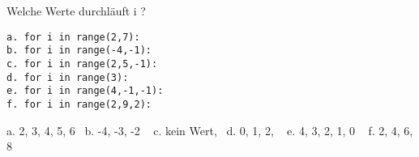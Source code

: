 \question[3] Welche Werte durchläuft i ? 
\begin{lstlisting}
a. for i in range(2,7):
b. for i in range(-4,-1):
c. for i in range(2,5,-1):
d. for i in range(3):
e. for i in range(4,-1,-1):
f. for i in range(2,9,2):
\end{lstlisting}
\begin{solutionbox}{3cm}
a. 2, 3, 4, 5, 6~ b. -4, -3, -2 ~ c. kein Wert, ~d. 0, 1, 2, ~ e. 4, 3, 2, 1, 0 ~ f. 2, 4, 6, 8
\end{solutionbox}
